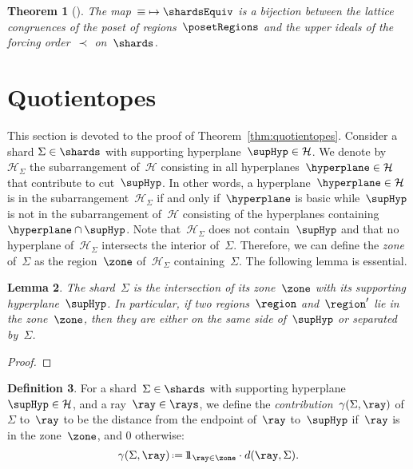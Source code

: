 \documentclass{amsart}
\newtheorem{theorem}{Theorem}%
\newtheorem{lemma}[theorem]{Lemma}
\theoremstyle{definition}
\newtheorem{definition}[theorem]{Definition}
\newcommand{\one}{{1\!\!1}} %
\newcommand{\eqdef}{\mbox{\,\raisebox{0.2ex}{\scriptsize\ensuremath{\mathrm:}}\ensuremath{=}\,}} %
\newcommand{\darkblue}{\color{darkblue}} %
\newcommand{\defn}[1]{\textsl{\darkblue #1}} %
\newcommand{\shard}{\Sigma}
\newcommand{\arrangement}{\mathcal{H}} %
\newcommand{\contribution}{\gamma} %
\newcommand{\distance}[2]{d(#1,#2)} %
\begin{document}
\begin{theorem}[{\cite[Sect.~10.5]{Reading-FiniteCoxeterGroupsChapter}}]
The map~${\equiv} \mapsto \shardsEquiv$ is a bijection between the lattice congruences of the poset of regions~$\posetRegions$ and the upper ideals of the forcing order~$\prec$ on~$\shards$.
\end{theorem}


\section{Quotientopes}

This section is devoted to the proof of Theorem~\ref{thm:quotientopes}.
%
Consider a shard $\shard \in \shards$ with supporting hyperplane~$\supHyp \in \arrangement$.
We denote by~$\arrangement_\shard$ the subarrangement of~$\arrangement$ consisting in all hyperplanes~$\hyperplane \in \arrangement$ that contribute to cut~$\supHyp$.
In other words, a hyperplane~$\hyperplane \in \arrangement$ is in the subarrangement~$\arrangement_\shard$ if and only if~$\hyperplane$ is basic while~$\supHyp$ is not in the subarrangement of~$\arrangement$ consisting of the hyperplanes containing~$\hyperplane \cap \supHyp$.
Note that~$\arrangement_\shard$ does not contain~$\supHyp$ and that no hyperplane of~$\arrangement_\shard$ intersects the interior of~$\shard$.
Therefore, we can define the \defn{zone} of~$\shard$ as the region~$\zone$ of~$\arrangement_\shard$ containing~$\shard$.
The following lemma is essential.

\begin{lemma}
The shard~$\shard$ is the intersection of its zone~$\zone$ with its supporting hyperplane~$\supHyp$.
In particular, if two regions~$\region$ and~$\region'$ lie in the zone~$\zone$, then they are either on the same side of~$\supHyp$ or separated by~$\shard$.
\end{lemma}

\begin{proof}

\end{proof}

\begin{definition}
For a shard~$\shard \in \shards$ with supporting hyperplane~$\supHyp \in \arrangement$, and a ray~$\ray \in \rays$, we define the \defn{contribution}~$\contribution(\shard, \ray)$ of~$\shard$ to~$\ray$ to be the distance from the endpoint of~$\ray$ to~$\supHyp$ if~$\ray$ is in the zone~$\zone$, and $0$ otherwise:
\[
\contribution(\shard, \ray) \eqdef \one_{\ray \in \zone} \cdot \distance{\ray}{\shard}.
\]
\end{definition}
\end{document}
